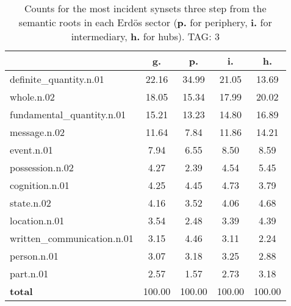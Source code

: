 \begin{table}[h!]
\begin{center}
\begin{tabular}{| l || c | c | c | c |}\hline
 & {\bf g.} & {\bf p.} & {\bf i.} & {\bf h.} \\\hline\hline
definite\_quantity.n.01 & 22.16  & 34.99  & 21.05  & 13.69 \\\hline
whole.n.02 & 18.05  & 15.34  & 17.99  & 20.02 \\\hline
fundamental\_quantity.n.01 & 15.21  & 13.23  & 14.80  & 16.89 \\\hline
message.n.02 & 11.64  & 7.84  & 11.86  & 14.21 \\\hline
event.n.01 & 7.94  & 6.55  & 8.50  & 8.59 \\\hline
possession.n.02 & 4.27  & 2.39  & 4.54  & 5.45 \\\hline
cognition.n.01 & 4.25  & 4.45  & 4.73  & 3.79 \\\hline
state.n.02 & 4.16  & 3.52  & 4.06  & 4.68 \\\hline
location.n.01 & 3.54  & 2.48  & 3.39  & 4.39 \\\hline
written\_communication.n.01 & 3.15  & 4.46  & 3.11  & 2.24 \\\hline
person.n.01 & 3.07  & 3.18  & 3.25  & 2.88 \\\hline
part.n.01 & 2.57  & 1.57  & 2.73  & 3.18 \\\hline\hline
{{\bf total}} & 100.00  & 100.00  & 100.00  & 100.00 \\\hline
\end{tabular}
\caption{Counts for the most incident synsets three step from the semantic roots in each Erd\"os sector ({\bf p.} for periphery, {\bf i.} for intermediary, {\bf h.} for hubs). TAG: 3}
\end{center}
\end{table}